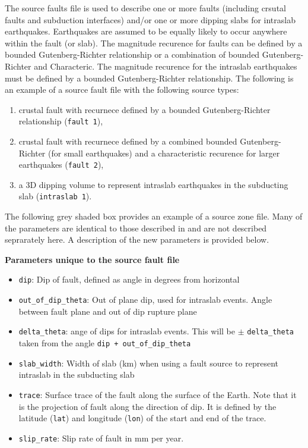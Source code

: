 The source faults file is used to describe one or more faults
(including crsutal faults and subduction interfaces) and/or one or
more dipping slabs for intraslab earthquakes. Earthquakes are
assumed to be equally likely to occur anywhere within the fault (or
slab). The magnitude recurence for faults can be defined by a
bounded Gutenberg-Richter relationship or a combination of bounded
Gutenberg-Richter and Characteric. The magnitude recurence for the
intraslab earthquakes must be defined by a bounded Gutenberg-Richter
relationship. The following is an example of a source fault file
with the following source types:
\begin{enumerate}
\item crustal fault with recurnece defined by a bounded Gutenberg-Richter
relationship (\texttt{fault 1}), \\
\item crustal fault with recurnece defined by a combined bounded Gutenberg-Richter
(for small earthquakes) and a characteristic recurence for larger
earthquakes (\texttt{fault 2}), \\
\item a 3D dipping volume to represent intraslab earthquakes in the
subducting slab (\texttt{intraslab 1}).
\end{enumerate}
The following grey shaded box provides an example of a source zone
file. Many of the parameters are identical to those described in
 and are not described seprarately here.
A description of the new parameters is provided below.


\textbf{Parameters unique to the source fault file}
\begin{itemize}
\item \texttt{dip}: Dip of fault, defined as angle in degrees from horizontal \\
\item \texttt{out\_of\_dip\_theta}: Out of plane dip, used for intraslab events. Angle between fault plane
and out of dip rupture plane \\
\item \texttt{delta\_theta}: ange of dips for intraslab events. This will be $\pm$ \texttt{delta\_theta}
taken from the angle \texttt{dip + out\_of\_dip\_theta} \\
\item \texttt{slab\_width}: Width of slab (km) when using a fault source to represent intraslab
in the subducting slab \\
\item \texttt{trace}: Surface trace of the fault along the surface
of the Earth. Note that it is the projection of fault along the
direction of dip. It is defined by the latitude (\texttt{lat}) and
longitude (\texttt{lon}) of the start and end of the trace. \\
\item \texttt{slip\_rate}: Slip rate of fault in mm per year.
\end{itemize}


